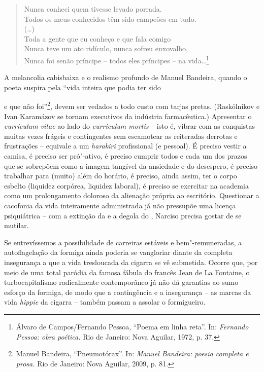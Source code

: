 \begin{verse}
Nunca conheci quem tivesse levado porrada.\\
Todos os meus conhecidos têm sido campeões \qb{}em tudo.\\
(\ldots{})\\[5pt]
Toda a gente que eu conheço e que fala comigo\\
Nunca teve um ato ridículo, nunca sofreu enxovalho,\\
Nunca foi senão príncipe -- todos eles príncipes -- \qb{}na vida\ldots{}\footnote{Álvaro
  de Campos/Fernando Pessoa, ``Poema em linha reta''. In: \emph{Fernando
  Pessoa: obra poética.} Rio de Janeiro: Nova Aguilar, 1972, p. 37.}
\end{verse}

A melancolia cabisbaixa e o realismo profundo de Manuel Bandeira, quando
o poeta suspira pela ``vida inteira que podia ter sido 

\noindent{}e que não
foi''\footnote{Manuel Bandeira, ``Pneumotórax''. In: \emph{Manuel
  Bandeira: poesia completa e prosa.} Rio de Janeiro: Nova Aguilar,
  2009, p. 81.}, devem ser vedados a todo custo com tarjas pretas.
(Raskólnikov e Ivan Karamázov se tornam executivos da indústria
farmacêutica.) Apresentar o \emph{curriculum vitae} ao lado do
\emph{curriculum mortis} -- isto é, vibrar com as conquistas muitas
vezes frágeis e contingentes sem escamotear as reiteradas derrotas e
frustrações -- equivale a um \emph{harakiri} profissional (e pessoal). É
preciso vestir a camisa, é preciso ser pró"-ativo, é preciso cumprir
todos e cada um dos prazos que se sobrepõem como a imagem tangível da
ansiedade e do desespero, é preciso trabalhar para (muito) além do
horário, é preciso, ainda assim, ter o corpo esbelto (liquidez corpórea,
liquidez laboral), é preciso se exercitar na academia como um
prolongamento doloroso da alienação própria ao escritório. Questionar a
cacofonia da vida inteiramente administrada já não pressupõe uma licença
psiquiátrica -- com a extinção da  e a degola do , Narciso
precisa gostar de se mutilar.

Se entrevíssemos a possibilidade de carreiras estáveis e
bem"-remuneradas, a autoflagelação da formiga ainda poderia se vangloriar
diante da completa insegurança a que a vida tresloucada da cigarra se vê
submetida. Ocorre que, por meio de uma total paródia da famosa fábula do
francês Jean de La Fontaine, o turbocapitalismo radicalmente
contemporâneo já não dá garantias ao sumo esforço da formiga, de modo
que a contingência e a insegurança -- as marcas da vida \emph{hippie} da
cigarra -- também passam a assolar o formigueiro.

